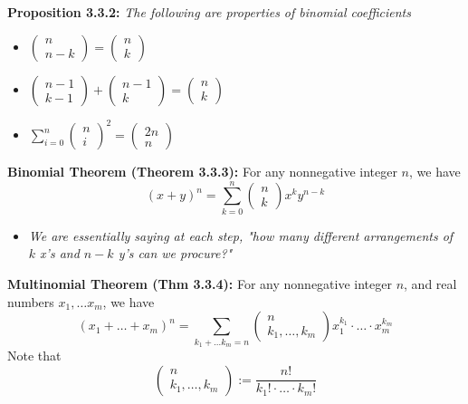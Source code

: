 \documentclass[12pt]{article}
\begin{document}
\textbf{Proposition 3.3.2: }\emph{The following are properties of binomial coefficients}
\begin{itemize}
    \item $\begin{pmatrix} n \\ n - k \end{pmatrix} = \begin{pmatrix} n \\ k \end{pmatrix}$
    \item $\begin{pmatrix} n - 1 \\ k - 1 \end{pmatrix} + \begin{pmatrix} n - 1 \\ k \end{pmatrix} = \begin{pmatrix} n \\ k \end{pmatrix}$
    \item $\sum_{i = 0}^{n} \begin{pmatrix} n \\ i \end{pmatrix}^2 = \begin{pmatrix} 2n \\ n \end{pmatrix}$
\end{itemize}

\textbf{Binomial Theorem (Theorem 3.3.3): }For any nonnegative integer $n$, we have $$(x + y)^n = \sum_{k = 0}^n \begin{pmatrix} n \\ k \end{pmatrix} x^k y^{n - k}$$
\begin{itemize}
    \item \emph{We are essentially saying at each step, "how many different arrangements of $k$ x's and $n - k$ y's can we procure?"}
\end{itemize}

\textbf{Multinomial Theorem (Thm 3.3.4): }For any nonnegative integer $n$, and real numbers $x_1, \dots x_m$, we have $$(x_1 + \dots + x_m)^n = \sum_{k_1 + \dots k_m = n} \begin{pmatrix} n \\ k_1, \dots, k_m \end{pmatrix} x_1^{k_1} \cdot \dots \cdot x_m^{k_m}$$
Note that $$\begin{pmatrix} n \\ k_1, \dots, k_m \end{pmatrix} := \frac{n!}{k_1! \cdot \dots \cdot k_m!}$$
\clearpage
\end{document}
